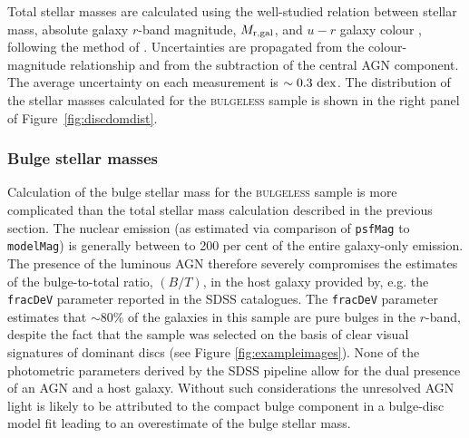 {Total stellar masses are calculated using the well-studied relation between stellar mass, absolute galaxy $r$-band magnitude, $M_{\rm{r, gal}}$, and $u-r$ galaxy colour \citep[corrected for galactic extinction;][using the galaxy magnitudes described in Section~\ref{sec:photo}]{schlegel98}, following the method of \citet[][see Section \ref{sec:defsample}]{Baldry06}. Uncertainties are propagated from the colour-magnitude relationship and from the subtraction of the central AGN component. The average uncertainty on each measurement is $\sim0.3~\rm{dex}$. The distribution of the stellar masses calculated for the \textsc{bulgeless} sample is shown in the right panel of Figure~\ref{fig:discdomdist}. 

\subsubsection{Bulge stellar masses}\label{sec:bulgemass}

Calculation of the bulge stellar mass for the \textsc{bulgeless} sample is more complicated than the total stellar mass calculation described in the previous section. The nuclear emission (as estimated via comparison of {\tt psfMag} to {\tt modelMag}) is generally between { to 200 per cent} of the entire galaxy-only emission. The presence of the luminous AGN therefore severely compromises the estimates of the bulge-to-total ratio, $(B/T)$, in the host galaxy provided by, e.g. the {\tt fracDeV} parameter reported in the SDSS catalogues. The {\tt fracDeV} parameter estimates that $\sim 80\%$ of the galaxies in this sample are pure \citet{devaucouleurs} bulges in the $r$-band, despite the fact that the sample was selected on the basis of clear visual signatures of dominant discs (see Figure \ref{fig:exampleimages}). None of the photometric parameters derived by the SDSS pipeline allow for the dual presence of an AGN and a host galaxy. Without such considerations the unresolved AGN light is likely to be attributed to the compact bulge component in a bulge-disc model fit \citep{simmons08,koss11} leading to an overestimate of the bulge stellar mass.


}
